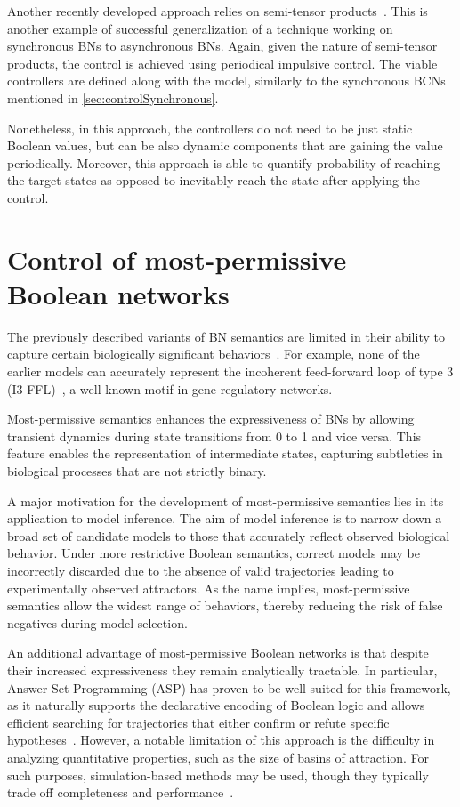 Another recently developed approach relies on semi-tensor products~\cite{Su2024}. This is another example of successful generalization of a technique working on synchronous BNs to asynchronous BNs. 
Again, given the nature of semi-tensor products, the control is achieved using periodical impulsive control. The viable controllers are defined along with the model, similarly to the synchronous BCNs mentioned in \autoref{sec:controlSynchronous}. 

Nonetheless, in this approach, the controllers do not need to be just static Boolean values, but can be also dynamic components that are gaining the value periodically. Moreover, this approach is able to quantify probability of reaching the target states as opposed to inevitably reach the state after applying the control.

\section{Control of most-permissive Boolean networks}
\label{sec:controlMostPermissive}

The previously described variants of BN semantics are limited in their ability to capture certain biologically significant behaviors~\cite{Pauleve2020}. For example, none of the earlier models can accurately represent the incoherent feed-forward loop of type 3 (I3-FFL)~\cite{Mangan2003}, a well-known motif in gene regulatory networks.

Most-permissive semantics enhances the expressiveness of BNs by allowing transient dynamics during state transitions from 0 to 1 and vice versa. This feature enables the representation of intermediate states, capturing subtleties in biological processes that are not strictly binary.

A major motivation for the development of most-permissive semantics lies in its application to model inference. The aim of model inference is to narrow down a broad set of candidate models to those that accurately reflect observed biological behavior. Under more restrictive Boolean semantics, correct models may be incorrectly discarded due to the absence of valid trajectories leading to experimentally observed attractors. As the name implies, most-permissive semantics allow the widest range of behaviors, thereby reducing the risk of false negatives during model selection.

An additional advantage of most-permissive Boolean networks is that despite their increased expressiveness they remain analytically tractable. In particular, Answer Set Programming (ASP) has proven to be well-suited for this framework, as it naturally supports the declarative encoding of Boolean logic and allows efficient searching for trajectories that either confirm or refute specific hypotheses~\cite{Pauleve2020}. However, a notable limitation of this approach is the difficulty in analyzing quantitative properties, such as the size of basins of attraction. For such purposes, simulation-based methods may be used, though they typically trade off completeness and performance~\cite{Roncalli2022}.

